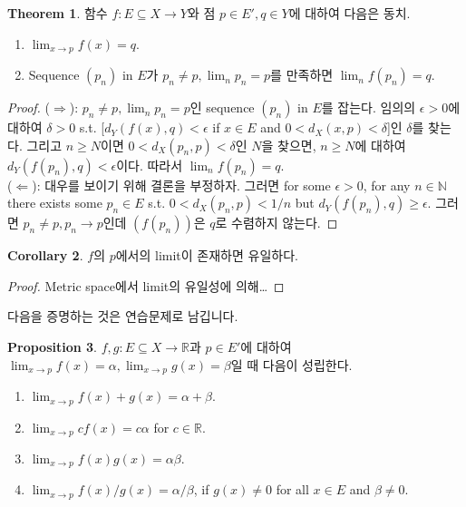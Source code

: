 \documentclass[12pt]{article}
\theoremstyle{definition}
\newtheorem{thm}{Theorem}[section]
\newtheorem{cor}[thm]{Corollary}
\newtheorem{prop}[thm]{Proposition}
\def\NN{\mathbb{N}}
\def\RR{\mathbb{R}}
\def\eps{\epsilon}
\begin{document}
\begin{thm} \label{thm lim seq}
	함수 \(f: E \subseteq X \rightarrow Y\)와 점 \(p \in E', q \in Y\)에 대하여 다음은 동치.
	\begin{enumerate}[label=(\alph*), leftmargin=2\parindent]
		\item
		\(\lim_{x \rightarrow p} f(x) = q\).
		\item
		Sequence \((p_n)\) in \(E\)가 \(p_n \neq p, \lim_n p_n = p\)를 만족하면 \(\lim_n f(p_n) = q\).
	\end{enumerate}
\end{thm}
\begin{proof}
	($\Rightarrow$): \(p_n \neq p, \lim_n p_n = p\)인 sequence \((p_n)\) in \(E\)를 잡는다. 임의의 \(\eps > 0\)에 대하여 \(\delta > 0\) s.t. [\(d_Y (f(x), q) < \eps\) if \(x \in E\) and \(0 < d_X (x, p) < \delta\)]인 \(\delta\)를 찾는다. 그리고 \(n \ge N\)이면 \(0 < d_X (p_n, p) < \delta\)인 \(N\)을 찾으면, \(n \ge N\)에 대하여 \(d_Y (f(p_n), q) < \eps\)이다. 따라서 \(\lim_n f(p_n) = q\).\\
	($\Leftarrow$): 대우를 보이기 위해 결론을 부정하자. 그러면 for some \(\eps > 0\), for any \(n \in \NN\) there exists some \(p_n \in E\) s.t. \(0 < d_X (p_n, p) < 1/n\) but \(d_Y (f(p_n), q) \ge \eps\). 그러면 \(p_n \neq p, p_n \rightarrow p\)인데 \((f(p_n))\)은 \(q\)로 수렴하지 않는다.
\end{proof}

\begin{cor}
	\(f\)의 \(p\)에서의 limit이 존재하면 유일하다.
\end{cor}
\begin{proof}
	Metric space에서 limit의 유일성에 의해\ldots
\end{proof}

다음을 증명하는 것은 연습문제로 남깁니다.

\begin{prop}
	\(f, g : E \subseteq X \rightarrow \RR\)과 \(p \in E'\)에 대하여 \(\lim_{x \rightarrow p} f(x) = \alpha, \lim_{x \rightarrow p} g(x) = \beta\)일 때 다음이 성립한다.
	\begin{enumerate}[label=(\alph*), leftmargin=2\parindent]
		\item
		\(\lim_{x \rightarrow p} f(x)+g(x) = \alpha + \beta\).
		\item
		\(\lim_{x \rightarrow p} cf(x) = c\alpha\) for \(c \in \RR\).
		\item
		\(\lim_{x \rightarrow p} f(x)g(x) = \alpha\beta\).
		\item
		\(\lim_{x \rightarrow p} f(x)/g(x) = \alpha/\beta\), if \(g(x) \neq 0\) for all \(x \in E\) and \(\beta \neq 0\).
	\end{enumerate}
\end{prop}
\end{document}
